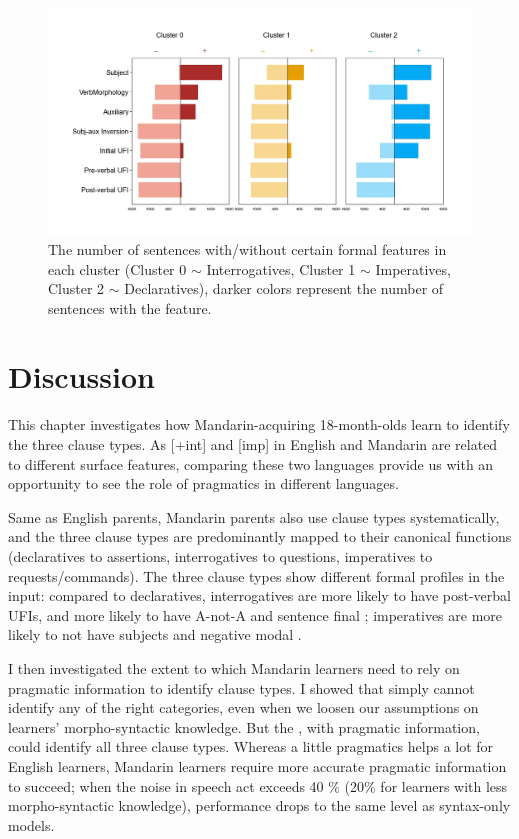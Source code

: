 \begin{figure}[H]
    \centering
    \includegraphics[width=1\textwidth]{figures/noisy100-syncluster.jpg}
    \caption{The number of sentences with/without certain formal features in each cluster (Cluster 0 $\sim$ Interrogatives, Cluster 1 $\sim$ Imperatives, Cluster 2 $\sim$ Declaratives), darker colors represent the number of sentences with the feature.}
    \label{fig:noisy100-syncluster}
\end{figure}


\section{Discussion}
\label{sec:mancl:discussion}

This chapter investigates how Mandarin-acquiring 18-month-olds learn to identify the three clause types. As [+int] and [imp] in English and Mandarin are related to different surface features, comparing these two languages provide us with an opportunity to see the role of pragmatics in different languages.

Same as English parents, Mandarin parents also 
use clause types systematically, and the three clause types are predominantly mapped to their canonical functions (declaratives to assertions, interrogatives to questions, imperatives to requests/commands). The three clause types show different formal profiles in the input: compared to declaratives, interrogatives are more likely to have post-verbal UFIs, and more likely to have A-not-A and sentence final ; imperatives are more likely to not have subjects and negative modal .

I then investigated the extent to which Mandarin learners need to rely on pragmatic information to identify clause types. I showed that \dlearnerabbr{} simply cannot identify any of the right categories, even when we loosen our assumptions on learners' morpho-syntactic knowledge. But the \plearnerabbr{}, with pragmatic information, could identify all three clause types. Whereas a little pragmatics helps a lot for English learners, Mandarin learners require more accurate pragmatic information to succeed; when the noise in speech act exceeds 40 \% (20\% for learners with less morpho-syntactic knowledge), performance drops to the same level as syntax-only models.

